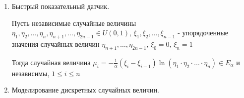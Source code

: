 \documentclass[12pt]{article}
\begin{document}
\begin{enumerate}
\begin{enumerate}[label*=\Roman*. ]
\begin{MyTheorem}
            $X = \sqrt{-2\ln \eta_1} \cos (2 \pi \eta_2)$

            $Y = \sqrt{-2\ln \eta_1} \sin (2 \pi \eta_2)$
        \end{MyTheorem}
        
        \begin{MyProof}
            Пусть $X, Y \in N(0, 1)$ независимы, тогда плотность $f_{X, Y}(x, y) = f_X(x)f_Y(y) = \frac{1}{2\pi} e^{-\frac{1}{2} (x^2 + y^2)}$

            Перейдем к полярным координатам:

            $x = r \cos \varphi, y = r \sin \varphi, |J| = r$

            Плотность: $f_{\Phi, R}(\varphi, r) = \frac{1}{2\pi} e^{-\frac{1}{2}r^2} r$

            Так как $\varphi \in U(0, 2\pi)$, то $f_{\Phi}(\varphi) = \frac{1}{2\pi}$ и $f_{\Phi, R}(\varphi, r) = \underset{f_\Phi}{\underbrace{\frac{1}{2\pi}}} \cdot \underset{f_R}{\underbrace{r e^{-\frac{1}{2}r^2}}} \Longrightarrow \Phi$ и $R$ - независимы 

            Смоделируем $f_R$ методом обратной функции

            $F_R(r) = \int_0^r r e^{-\frac{r^2}{2}} dr = -\int_0^r r e^{-\frac{r^2}{2}} d\left(-\frac{r^2}{2}\right) = e^{-\frac{r^2}{2}} \Big|_0^r = 1 - e^{-\frac{r^2}{2}} = \eta_1$. Тогда $r = \sqrt{-2\ln \eta_1}$

            Аналогично $F_\Phi(\varphi) = \int_0^\varphi \frac{1}{2\pi} d\varphi = \frac{\varphi}{2\pi} = \eta_2 \Longrightarrow \varphi = 2\pi \eta_2$
        \end{MyProof}
    \end{enumerate}

    \item Быстрый показательный датчик.

    \begin{MyTheorem}
        \Ths Пусть независимые случайные величины $\eta_1, \eta_2, \dots, \eta_n, \eta_{n+1}, \dots, \eta_{2n - 1} \in U(0, 1)$, $\xi_1, \xi_2, \dots, \xi_{n - 1}$ - упорядоченные значения случайных величин $\eta_{n + 1}, \dots, \eta_{2n - 1}$, $\xi_0 = 0$, $\xi_n = 1$
    
        Тогда случайная величина $\mu_i = -\frac{1}{\alpha}(\xi_i - \xi_{i - 1}) \ln (\eta_1 \cdot \eta_2 \cdot \dots \cdot \eta_n) \in E_\alpha$ и независимы, $1 \leq i \leq n$
    \end{MyTheorem}

    \item Моделирование дискретных случайных величин.


\end{enumerate}
\end{document}
